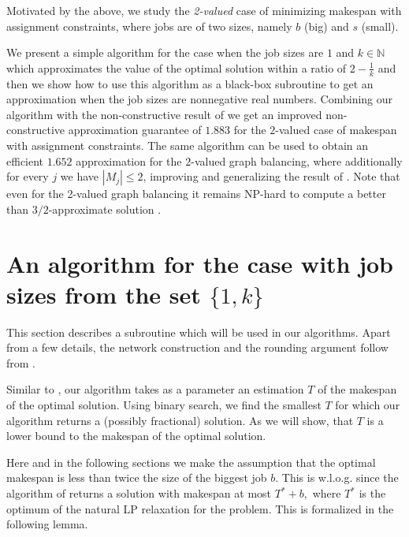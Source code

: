 \documentclass[11pt]{article}\usepackage{amsmath}
\begin{document}
Motivated by the above, 
we study the {\em 2-valued} case of minimizing makespan 
with assignment
constraints, where     jobs are of two sizes,  namely $b$ (big) and
$s$ (small). 
\iffalse ========================================
As mentioned,  the
approximation hardness of the problem is still $3/2,$ unless ${\sf P} = {\sf
  NP}$
(\cite{lenstra},\cite{ebenlendr})  and  the  integrality  gap  of  the
natural LP of
\cite{lenstra}  is  still $2$ \cite{ebenlendr}.  
=================================== \fi
We 
present a  simple  algorithm for the case when the job sizes are
$1$ and $k \in \mathbb{N}$ which approximates the value of the
optimal solution  within a ratio  of $2-\frac{1}{k}$ and then  we show
how to use this algorithm as  a black-box subroutine to get an approximation when
the job  sizes are nonnegative  real numbers. Combining  our algorithm
with the non-constructive result of \cite{svensson} we get an improved
non-constructive approximation guarantee  of $1.883$ for the $2$-valued
case of  makespan with assignment constraints. The  same algorithm can
be used to obtain an efficient $1.652$ approximation for the $2$-valued
graph balancing, where additionally for every $j$ we have $|M_j| \leq 2$, 
improving and generalizing the result of
\cite{asa}. Note  that even
for the 
2-valued graph
balancing 
it remains {\sf NP}-hard to compute a better than $3/2$-approximate
solution 
\cite{asa, ebenlendr}.


\section{An algorithm for the case with job sizes from the set $\{ 1, k \}$ }

This section describes a subroutine which will be used in our
algorithms. 
Apart from a few details, the network construction and the rounding
argument follow from \cite{Kleinberg96a}. 

Similar to \cite{lenstra}, our algorithm takes as a parameter an estimation $T$ of the makespan of the optimal solution. Using binary search, we find the smallest $T$ for which our algorithm returns a (possibly fractional) solution. As we will show, that $T$ is a lower bound to the makespan of the optimal solution.

Here and in the following sections we make the assumption that the optimal makespan is less than twice the size of the biggest job $b$. This is w.l.o.g. since the algorithm 
of \cite{lenstra} returns a solution with makespan at most $T^*+b,$
where  $T^*$ is the optimum of the natural LP relaxation for the
problem.  This is formalized in the following lemma. 
\end{document}
